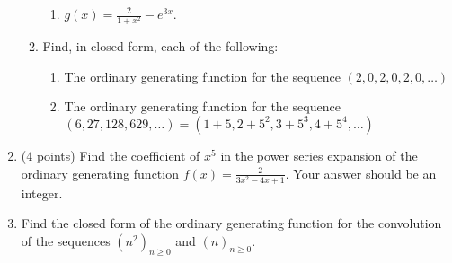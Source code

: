 \documentclass{article}
\begin{document}
\begin{enumerate}
\begin{enumerate}
\begin{enumerate}
        \item $g(x)=\frac{2}{1+x^2}-e^{3 x}$.
          \begin{answer}
          \end{answer}
    \end{enumerate}
    \item Find, in closed form, each of the following:
    \begin{enumerate}
        \item The ordinary generating function for the sequence $(2,0,2,0,2,0, \ldots)$
          \begin{answer}
          \end{answer}
        \item The ordinary generating function for the sequence 
        $(6,27,128,629, \ldots)=\left(1+5,2+5^2, 3+5^3, 4+5^4, \ldots\right)$
          \begin{answer}
          \end{answer}
    \end{enumerate}
  \end{enumerate}
  \item (4 points) Find the coefficient of $x^5$ in the power series expansion of the ordinary 
  generating function $f(x)= \frac{2}{3 x^2-4 x+1}$. Your answer should be an integer.
  \begin{answer}
  \end{answer}
  \item Find the closed form of the ordinary generating function for the convolution 
  of the sequences $\left(n^2\right)_{n \geq 0}$ and $(n)_{n \geq 0}$.
  \begin{answer}
  \end{answer}






















\end{enumerate}
\end{document}
